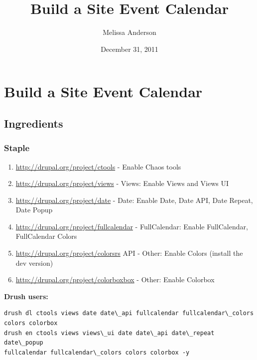 \documentclass[letterpaper,10pt,english]{sphinxmanual}
\title{Build a Site Event Calendar}
\date{December 31, 2011}
\author{Melissa Anderson}
\begin{document}
\maketitle
\tableofcontents
{}\label{index::doc}



\chapter{Build a Site Event Calendar}
\label{event_calendar::doc}\label{event_calendar:build-a-site-event-calendar}

\section{Ingredients}
\label{event_calendar:ingredients}

\subsection{Staple}
\label{event_calendar:staple}\begin{enumerate}
\item {} 
\href{http://drupal.org/project/ctools}{http://drupal.org/project/ctools} - Enable Chaos tools

\item {} 
\href{http://drupal.org/project/views}{http://drupal.org/project/views} - Views: Enable Views and Views UI

\item {} 
\href{http://drupal.org/project/date}{http://drupal.org/project/date} - Date: Enable Date, Date API, Date Repeat, Date Popup

\item {} 
\href{http://drupal.org/project/fullcalendar}{http://drupal.org/project/fullcalendar} - FullCalendar: Enable FullCalendar, FullCalendar Colors

\item {} 
\href{http://drupal.org/project/colorsrs}{http://drupal.org/project/colorsrs} API - Other: Enable Colors (install the dev version)

\item {} 
\href{http://drupal.org/project/colorboxbox}{http://drupal.org/project/colorboxbox} - Other: Enable Colorbox

\end{enumerate}

\textbf{Drush users:}

\begin{Verbatim}[commandchars=\\\{\}]
drush dl ctools views date date\_api fullcalendar fullcalendar\_colors colors colorbox
drush en ctools views views\_ui date date\_api date\_repeat date\_popup
fullcalendar fullcalendar\_colors colors colorbox -y
\end{Verbatim}
\end{document}
